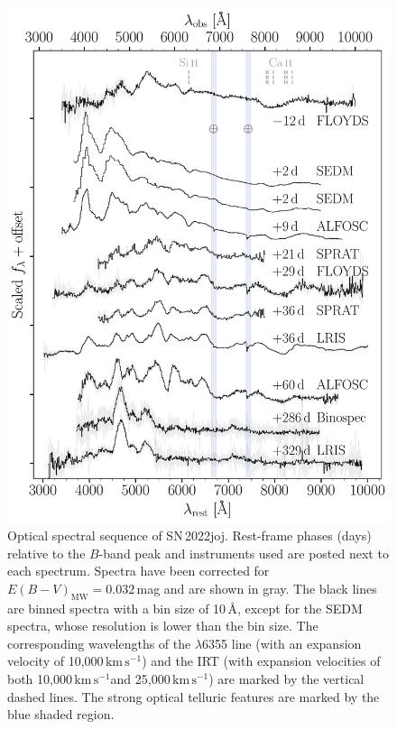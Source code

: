 \documentclass[twocolumn]{aastex631}
\newcommand{\sn}{SN\,2022joj}
\newcommand{\kms}{$\mathrm{km}\,\mathrm{s}^{-1}$}
\begin{document}
\begin{CJK*}{UTF8}{gbsn}
\begin{figure}
    \centering
    \includegraphics[width=\linewidth]{SN2022joj_spectral_sequence.pdf}
    \caption{Optical spectral sequence of \sn. Rest-frame phases (days) relative to the $B$-band peak and instruments used are posted next to each spectrum. Spectra have been corrected for $E(B-V)_\mathrm{MW} = 0.032$\,mag and are shown in gray. The black lines are binned spectra with a bin size of 10\,\AA, except for the SEDM spectra, whose resolution is lower than the bin size. The corresponding wavelengths of the  $\lambda$6355 line (with an expansion velocity of 10,000\,\kms) and the  IRT (with expansion velocities of both 10,000\,\kms and 25,000\,\kms) are marked by the vertical dashed lines. The strong optical telluric features are marked by the blue shaded region.}
    \label{fig:spec_seq}
\end{figure}




\end{CJK*}
\end{document}
